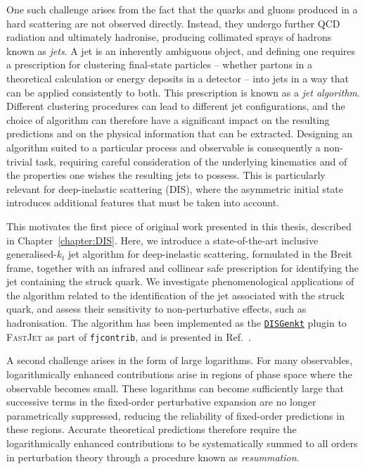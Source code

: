 One such challenge arises from the fact that the quarks and gluons produced in
a hard scattering are not observed directly. Instead, they undergo further QCD
radiation and ultimately hadronise, producing collimated sprays of hadrons known
as \emph{jets}. A jet is an inherently ambiguous object, and defining one
requires a prescription for clustering final-state particles -- whether partons
in a theoretical calculation or energy deposits in a detector -- into jets in a
way that can be applied consistently to both. This prescription is known as a
\emph{jet algorithm}. Different clustering procedures can lead to different jet
configurations, and the choice of algorithm can therefore have a significant
impact on the resulting predictions and on the physical information that can be
extracted. Designing an algorithm suited to a particular process and observable
is consequently a non-trivial task, requiring careful consideration of the
underlying kinematics and of the properties one wishes the resulting jets to
possess. This is particularly relevant for deep-inelastic scattering (DIS),
where the asymmetric initial state introduces additional features that must be
taken into account.

This motivates the first piece of original work presented in this thesis, described in
Chapter~\ref{chapter:DIS}. Here, we introduce a state-of-the-art inclusive generalised-$k_t$ jet
algorithm for deep-inelastic scattering, formulated in the Breit frame, together with an infrared and collinear safe
prescription for identifying the jet containing the struck quark. We investigate phenomenological applications of the algorithm related to the identification of the jet associated with the struck
quark, and assess their sensitivity to non-perturbative effects, such as hadronisation. 
The algorithm has been implemented as the \href{https://repo.hepforge.org/source/fastjetsvn/browse/contrib/contribs/DISGenkt}{\texttt{DISGenkt}} plugin to \textsc{FastJet} as part of \texttt{fjcontrib}, and is presented in
Ref.~\cite{vanBeekveld:2026rez}.

A second challenge arises in the form of large logarithms. For many observables,
logarithmically enhanced contributions arise in regions of phase space where the
observable becomes small. These logarithms can become sufficiently large that
successive terms in the fixed-order perturbative expansion are no longer
parametrically suppressed, reducing the reliability of fixed-order predictions
in these regions. Accurate theoretical predictions therefore require the
logarithmically enhanced contributions to be systematically summed to all orders
in perturbation theory through a procedure known as \emph{resummation}.

